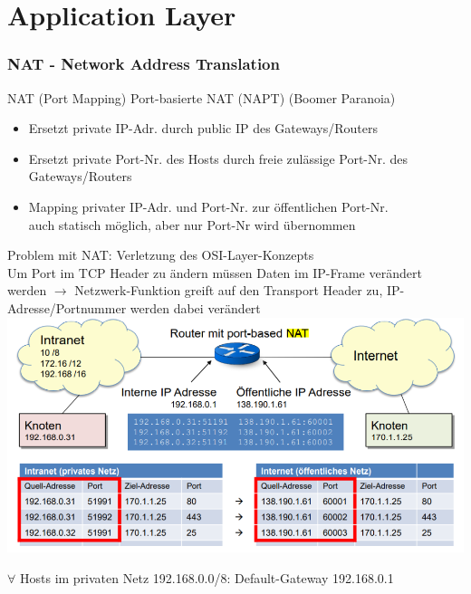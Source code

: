 


\section{Application Layer}

\subsubsection{NAT - Network Address Translation}

\begin{definition}{NAT (Port Mapping)} Port-basierte NAT (NAPT) {\tiny (Boomer Paranoia)}    
    \begin{itemize}
        \item Ersetzt private IP-Adr. durch public IP des Gateways/Routers
        \item Ersetzt private Port-Nr. des Hosts durch freie zulässige Port-Nr. des Gateways/Routers
        \item Mapping privater IP-Adr. und Port-Nr. zur öffentlichen Port-Nr.
                \\auch statisch möglich, aber nur Port-Nr wird übernommen
    \end{itemize}
    Problem mit NAT: Verletzung des OSI-Layer-Konzepts\\
    Um Port im TCP Header zu ändern müssen Daten im IP-Frame verändert werden 
    $\rightarrow$ Netzwerk-Funktion greift auf den Transport Header zu,
    IP-Adresse/Portnummer werden dabei verändert\\
        \includegraphics[width=1\linewidth]{images/NAT.png}
\end{definition}
\begin{remark}
    $\forall$ Hosts im privaten Netz 192.168.0.0/8: Default-Gateway 192.168.0.1
\end{remark}

